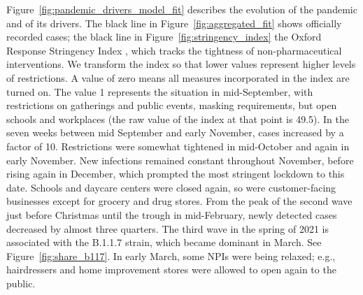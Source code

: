 Figure~\ref{fig:pandemic_drivers_model_fit} describes the evolution of the pandemic and
of its drivers. The black line in Figure~\ref{fig:aggregated_fit} shows officially
recorded cases; the black line in Figure~\ref{fig:stringency_index} the Oxford Response
Stringency Index \citep{Hale2020}, which tracks the tightness of non-pharmaceutical
interventions. We transform the index so that lower values represent higher levels of
restrictions. A value of zero means all measures incorporated in the index are turned
on. The value 1 represents the situation in mid-September, with restrictions on
gatherings and public events, masking requirements, but open schools and workplaces (the
raw value of the index at that point is 49.5). In the seven weeks between mid September
and early November, cases increased by a factor of 10. Restrictions were somewhat
tightened in mid-October and again in early November. New infections remained constant
throughout November, before rising again in December, which prompted the most stringent
lockdown to this date. Schools and daycare centers were closed again, so were
customer-facing businesses except for grocery and drug stores. From the peak of the
second wave just before Christmas until the trough in mid-February, newly detected cases
decreased by almost three quarters. The third wave in the spring of 2021 is associated
with the B.1.1.7 strain, which became dominant in March. See
Figure~\ref{fig:share_b117}. In early March, some NPIs were being relaxed; e.g.,
hairdressers and home improvement stores were allowed to open again to the public.


